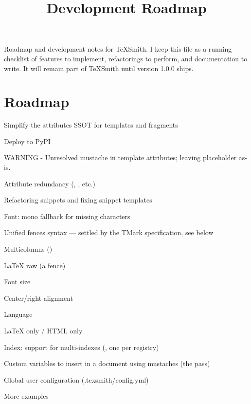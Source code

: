 \documentclass[a4paper,twoside]{article}
\title{Development Roadmap}
\author{}\date{}
\begin{document}
\maketitle
Roadmap and development notes for TeXSmith. I keep this file as a running checklist of features to implement, refactorings to perform, and documentation to write. It will remain part of TeXSmith until version 1.0.0 ships.
\section{Roadmap}
\begin{tstasklist}
\item[\tsdone] Simplify the attributes SSOT for templates and fragments
\item[\tsdone] Deploy to PyPI
\item[\tsdone] WARNING -  Unresolved mustache  in template attributes; leaving placeholder as-is.
\item[\tsdone] Attribute redundancy (, , etc.)
\item[\tsdone] Refactoring snippets and fixing snippet templates
\item[\tsdone] Font: mono fallback for missing characters
\item[\tsdone] Unified fences syntax --- settled by the TMark specification, see below
\begin{tstasklist}
\item[\tsdone] Multicolumns ()
\item[\tsdone] \LaTeX{} raw (a  fence)
\item[\tstodo] Font size
\item[\tstodo] Center/right alignment
\item[\tstodo] Language
\item[\tstodo] \LaTeX{} only / HTML only
\end{tstasklist}
\item[\tsdone] Index: support for multi-indexes (, one  per registry)
\item[\tsdone] Custom variables to insert in a document using mustaches (the  pass)
\item[\tstodo] Global user configuration (.texsmith/config.yml)
\item[\tstodo] More examples
\begin{tstasklist}

\end{tstasklist}
\end{tstasklist}
\end{document}
